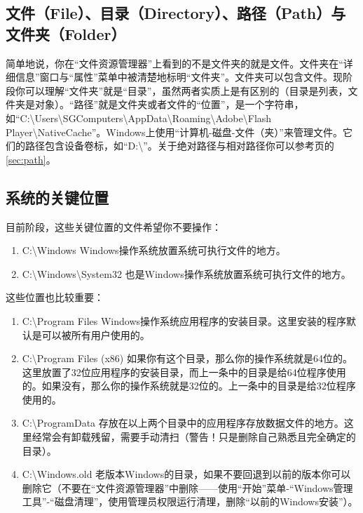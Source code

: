 \subsection{文件（File）、目录（Directory）、路径（Path）与文件夹（Folder）}
简单地说，你在“文件资源管理器”上看到的不是文件夹的就是文件。文件夹在“详细信息”窗口与“属性”菜单中被清楚地标明“文件夹”。文件夹可以包含文件。现阶段你可以理解“文件夹”就是“目录”，虽然两者实质上是有区别的（目录是列表，文件夹是对象）。“路径”就是文件夹或者文件的“位置”，是一个字符串，如“C:\textbackslash Users\textbackslash SGComputers\textbackslash AppData\textbackslash Roaming\textbackslash Adobe\textbackslash Flash Player\textbackslash NativeCache”。Windows上使用“计算机-磁盘-文件（夹）”来管理文件。它们的路径包含设备卷标，如“D:\textbackslash”。关于绝对路径与相对路径你可以参考\pageref{sec:path}页的\ref{sec:path}。
\subsection{系统的关键位置}
目前阶段，这些关键位置的文件希望你不要操作：
\begin{enumerate}
	\item C:\textbackslash Windows  Windows操作系统放置系统可执行文件的地方。
	\item C:\textbackslash Windows\textbackslash System32  也是Windows操作系统放置系统可执行文件的地方。
\end{enumerate}\par
这些位置也比较重要：
\begin{enumerate}
	\item C:\textbackslash Program Files Windows操作系统应用程序的安装目录。这里安装的程序默认是可以被所有用户使用的。
	\item C:\textbackslash Program Files (x86) 如果你有这个目录，那么你的操作系统就是64位的。这里放置了32位应用程序的安装目录，而上一条中的目录是给64位程序使用的。如果没有，那么你的操作系统就是32位的。上一条中的目录是给32位程序使用的。
	\item C:\textbackslash ProgramData  存放在以上两个目录中的应用程序存放数据文件的地方。这里经常会有卸载残留，需要手动清扫（警告！只是删除自己熟悉且完全确定的目录）。
	\item C:\textbackslash Windows.old  老版本Windows的目录，如果不要回退到以前的版本你可以删除它（不要在“文件资源管理器”中删除——使用“开始”菜单-“Windows管理工具”-“磁盘清理”，使用管理员权限运行清理，删除“以前的Windows安装”）。
\end{enumerate}
